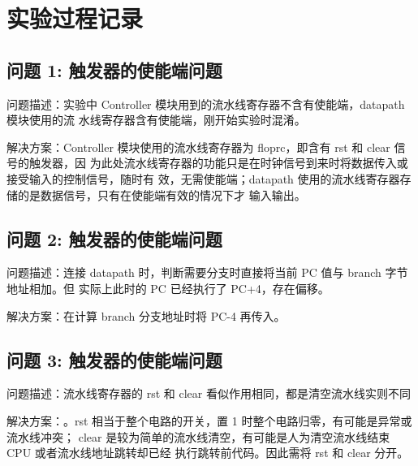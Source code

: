 \section{实验过程记录}

\subsection{问题 1: 触发器的使能端问题}
问题描述：实验中 Controller 模块用到的流水线寄存器不含有使能端，datapath 模块使用的流
水线寄存器含有使能端，刚开始实验时混淆。

解决方案：Controller 模块使用的流水线寄存器为 floprc，即含有 rst 和 clear 信号的触发器，因
为此处流水线寄存器的功能只是在时钟信号到来时将数据传入或接受输入的控制信号，随时有
效，无需使能端；datapath 使用的流水线寄存器存储的是数据信号，只有在使能端有效的情况下才
输入输出。
\subsection{问题 2: 触发器的使能端问题}
问题描述：连接 datapath 时，判断需要分支时直接将当前 PC 值与 branch 字节地址相加。但
实际上此时的 PC 已经执行了 PC+4，存在偏移。

解决方案：在计算 branch 分支地址时将 PC-4 再传入。
\subsection{问题 3: 触发器的使能端问题}
问题描述：流水线寄存器的 rst 和 clear 看似作用相同，都是清空流水线实则不同

解决方案：。rst 相当于整个电路的开关，置 1 时整个电路归零，有可能是异常或流水线冲突；
clear 是较为简单的流水线清空，有可能是人为清空流水线结束 CPU 或者流水线地址跳转却已经
执行跳转前代码。因此需将 rst 和 clear 分开。